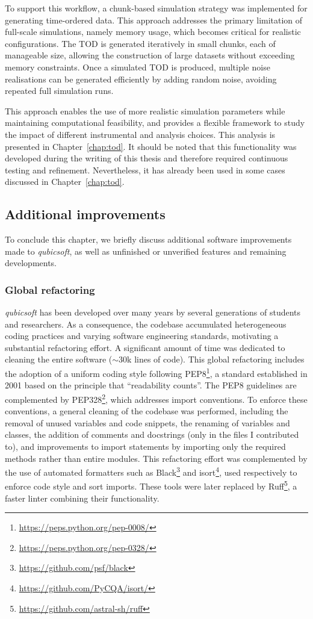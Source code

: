 \documentclass[../../thesis.tex]{subfiles}
\begin{document}
To support this workflow, a chunk-based simulation strategy was implemented for generating time-ordered data. This approach addresses the primary limitation of full-scale simulations, namely memory usage, which becomes critical for realistic configurations. The TOD is generated iteratively in small chunks, each of manageable size, allowing the construction of large datasets without exceeding memory constraints. Once a simulated TOD is produced, multiple noise realisations can be generated efficiently by adding random noise, avoiding repeated full simulation runs.

This approach enables the use of more realistic simulation parameters while maintaining computational feasibility, and provides a flexible framework to study the impact of different instrumental and analysis choices. This analysis is presented in Chapter~\ref{chap:tod}.
It should be noted that this functionality was developed during the writing of this thesis and therefore required continuous testing and refinement. Nevertheless, it has already been used in some cases discussed in Chapter~\ref{chap:tod}.

\subsection{Additional improvements}

To conclude this chapter, we briefly discuss additional software improvements made to \emph{qubicsoft}, as well as unfinished or unverified features and remaining developments.

\subsubsection{Global refactoring}

\emph{qubicsoft} has been developed over many years by several generations of students and researchers. As a consequence, the codebase accumulated heterogeneous coding practices and varying software engineering standards, motivating a substantial refactoring effort. A significant amount of time was dedicated to cleaning the entire software ($\sim 30$k lines of code).
This global refactoring includes the adoption of a uniform coding style following PEP8\footnote{\url{https://peps.python.org/pep-0008/}}, a standard established in 2001 based on the principle that \enquote{readability counts}. The PEP8 guidelines are complemented by PEP328\footnote{\url{https://peps.python.org/pep-0328/}}, which addresses import conventions.
To enforce these conventions, a general cleaning of the codebase was performed, including the removal of unused variables and code snippets, the renaming of variables and classes, the addition of comments and docstrings (only in the files I contributed to), and improvements to import statements by importing only the required methods rather than entire modules. This refactoring effort was complemented by the use of automated formatters such as Black\footnote{\url{https://github.com/psf/black}} and isort\footnote{\url{https://github.com/PyCQA/isort/}}, used respectively to enforce code style and sort imports. These tools were later replaced by Ruff\footnote{\url{https://github.com/astral-sh/ruff}}, a faster linter combining their functionality.
\end{document}
